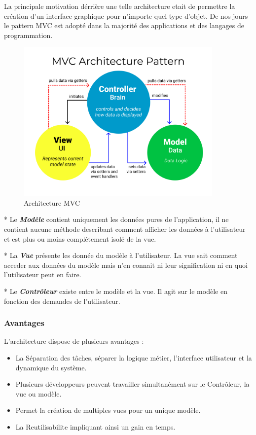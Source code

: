 \documentclass[12pt]{article}
\begin{document}
La principale motivation dérrière une telle architecture etait de permettre la création d'un interface
graphique pour n'importe quel type d'objet. De nos jours le pattern MVC est adopté dans la majorité des applications
et des langages de programmation.
\begin{figure}[h!]
	\begin{center}
		\includegraphics[width=0.90\textwidth]{MVC3.png}
	\end{center}
	\caption{Architecture MVC}
	\label{taquin}
\end{figure}

* Le \textbf{\textit{Modèle}} contient uniquement les données pures de l'application, il ne contient
aucune méthode describant comment afficher les données à l'utilisateur et est plus ou moins 
complétement isolé de la vue.

* La \textbf{\textit{Vue}} présente les donnée du modèle à l'utilisateur. La vue sait comment acceder 
aux données du modèle mais n'en connait ni leur signification ni en quoi l'utilisateur peut en faire.

* Le \textbf{\textit{Contrôleur}} existe entre le modèle et la vue. Il agit sur le modèle en fonction 
des demandes de l'utilisateur.

\subsubsection{Avantages}
L'architecture dispose de plusieurs avantages :
\begin{itemize}
    \item La Séparation des tâches, séparer la logique métier, l'interface utilisateur et la dynamique du système.
    \item Plusieurs développeurs peuvent travailler simultanément sur le Contrôleur, la vue ou modèle.
    \item Permet la création de multiples vues pour un unique modèle.
    \item La Reutilisabilite impliquant ainsi un gain en temps.
\end{itemize}
\end{document}

